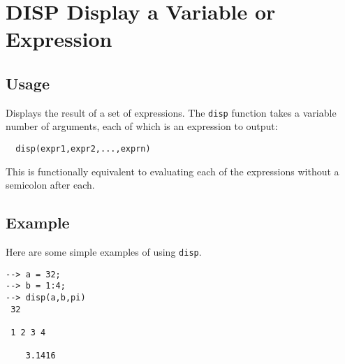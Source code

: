 \section{DISP Display a Variable or Expression}

\subsection{Usage}

Displays the result of a set of expressions.  The \verb|disp| function
takes a variable number of arguments, each of which is an expression
to output:
\begin{verbatim}
  disp(expr1,expr2,...,exprn)
\end{verbatim}
This is functionally equivalent to evaluating each of the expressions
without a semicolon after each.
\subsection{Example}

Here are some simple examples of using \verb|disp|.
\begin{verbatim}
--> a = 32;
--> b = 1:4;
--> disp(a,b,pi)
 32 

 1 2 3 4 

    3.1416 
\end{verbatim}
